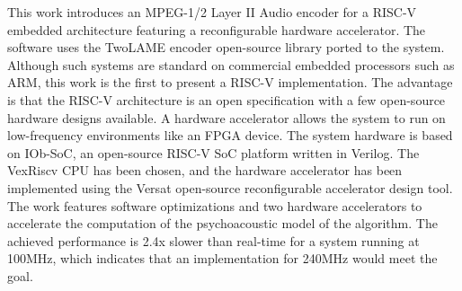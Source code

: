 \hspace{0.4cm}
This work introduces an MPEG-1/2 Layer II Audio encoder for a RISC-V embedded
architecture featuring a reconfigurable hardware accelerator. The software uses
the TwoLAME encoder open-source library ported to the system. Although such
systems are standard on commercial embedded processors such as ARM, this work is
the first to present a RISC-V implementation. The advantage is that the RISC-V
architecture is an open specification with a few open-source hardware designs
available. A hardware accelerator allows the system to run on low-frequency
environments like an FPGA device. The system hardware is based on IOb-SoC, an
open-source RISC-V SoC platform written in Verilog. The VexRiscv CPU has been
chosen, and the hardware accelerator has been implemented using the Versat
open-source reconfigurable accelerator design tool. The work features software
optimizations and two hardware accelerators to accelerate the computation of the
psychoacoustic model of the algorithm. The achieved performance is 2.4x slower
than real-time for a system running at 100MHz, which indicates that an
implementation for 240MHz would meet the goal.

